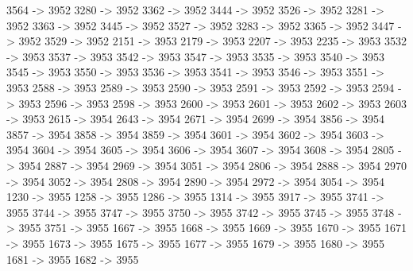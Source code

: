 {	3564 -> 3952
	3280 -> 3952
	3362 -> 3952
	3444 -> 3952
	3526 -> 3952
	3281 -> 3952
	3363 -> 3952
	3445 -> 3952
	3527 -> 3952
	3283 -> 3952
	3365 -> 3952
	3447 -> 3952
	3529 -> 3952
	2151 -> 3953
	2179 -> 3953
	2207 -> 3953
	2235 -> 3953
	3532 -> 3953
	3537 -> 3953
	3542 -> 3953
	3547 -> 3953
	3535 -> 3953
	3540 -> 3953
	3545 -> 3953
	3550 -> 3953
	3536 -> 3953
	3541 -> 3953
	3546 -> 3953
	3551 -> 3953
	2588 -> 3953
	2589 -> 3953
	2590 -> 3953
	2591 -> 3953
	2592 -> 3953
	2594 -> 3953
	2596 -> 3953
	2598 -> 3953
	2600 -> 3953
	2601 -> 3953
	2602 -> 3953
	2603 -> 3953
	2615 -> 3954
	2643 -> 3954
	2671 -> 3954
	2699 -> 3954
	3856 -> 3954
	3857 -> 3954
	3858 -> 3954
	3859 -> 3954
	3601 -> 3954
	3602 -> 3954
	3603 -> 3954
	3604 -> 3954
	3605 -> 3954
	3606 -> 3954
	3607 -> 3954
	3608 -> 3954
	2805 -> 3954
	2887 -> 3954
	2969 -> 3954
	3051 -> 3954
	2806 -> 3954
	2888 -> 3954
	2970 -> 3954
	3052 -> 3954
	2808 -> 3954
	2890 -> 3954
	2972 -> 3954
	3054 -> 3954
	1230 -> 3955
	1258 -> 3955
	1286 -> 3955
	1314 -> 3955
	3917 -> 3955
	3741 -> 3955
	3744 -> 3955
	3747 -> 3955
	3750 -> 3955
	3742 -> 3955
	3745 -> 3955
	3748 -> 3955
	3751 -> 3955
	1667 -> 3955
	1668 -> 3955
	1669 -> 3955
	1670 -> 3955
	1671 -> 3955
	1673 -> 3955
	1675 -> 3955
	1677 -> 3955
	1679 -> 3955
	1680 -> 3955
	1681 -> 3955
	1682 -> 3955
}            
